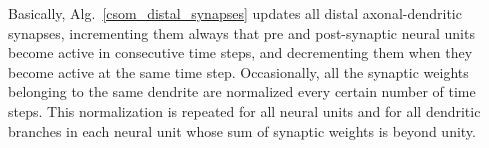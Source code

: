 {Basically, Alg.~\ref{csom_distal_synapses} updates all distal axonal-dendritic synapses, incrementing  them always that pre and post-synaptic neural units become active in consecutive time steps, and decrementing them when they become active at the same time step. Occasionally, all the synaptic weights belonging to the same dendrite are normalized every certain number of time steps. This normalization is repeated for all neural units and for all dendritic branches in each neural unit whose sum of synaptic weights is beyond unity.
}


























